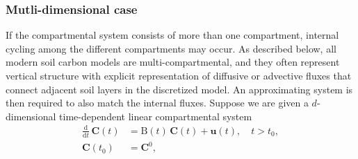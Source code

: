 \documentclass[11pt,a4paper]{article}
\renewcommand{\vec}[1]{\mathbf{#1}}
\newcommand{\tens}[1]{\mathrm{#1}}
\newcommand{\deriv}[1]{\frac{\mathrm{d}}{\mathrm{d}#1}}
\begin{document}
    \subsubsection*{Mutli-dimensional case}
        If the compartmental system consists of more than one compartment, internal cycling among the different compartments may occur. As described below, all modern soil carbon models are multi-compartmental, and they often represent vertical structure with explicit representation of diffusive or advective fluxes that connect adjacent soil layers in the discretized model.
        An approximating system is then required to also match the internal fluxes.
        Suppose we are given a $d$-dimensional time-dependent linear compartmental system
        \begin{equation}\label{eqn:CS_multi_dim}
            \begin{aligned}
                \deriv{t}\,\vec{C}(t) &= \tens{B}(t)\,\vec{C}(t) + \vec{u}(t),\quad t>t_0,\\
                \vec{C}(t_0) &= \vec{C}^0,
            \end{aligned}
        \end{equation}
\end{document}
